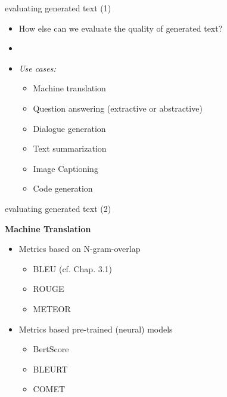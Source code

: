 
\begin{vbframe}{evaluating generated text (1)}

\vfill

\begin{itemize}
	\item \ques How else can we evaluate the quality of generated text?
	\item[]
	\item \textit{Use cases:} 
			\begin{itemize}
				\item Machine translation
				\item Question answering (extractive or abstractive)
				\item Dialogue generation
				\item Text summarization
				\item Image Captioning
				\item Code generation
			\end{itemize}
\end{itemize}

\vfill

\end{vbframe}


\begin{vbframe}{evaluating generated text (2)}

\vfill

\textbf{Machine Translation}

\begin{itemize}
	\item Metrics based on N-gram-overlap
			\begin{itemize}
				\item BLEU (cf. Chap. 3.1) 
				\item ROUGE 
				\item METEOR 
			\end{itemize}
	\item Metrics based pre-trained (neural) models
			\begin{itemize}
				\item BertScore 
				\item BLEURT 
				\item COMET 
			\end{itemize}
\end{itemize}

\vfill

\end{vbframe}

